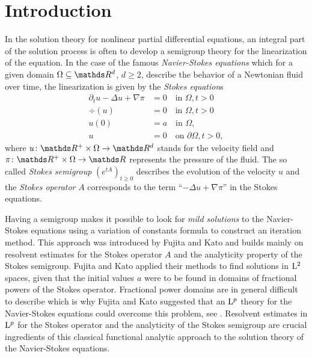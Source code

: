 \chapter*{Introduction}

In the solution theory for nonlinear partial differential equations, an integral part of the solution process is often to develop a semigroup theory for the linearization of the equation.
In the case of the famous \emph{Navier-Stokes equations} which for a given domain $\Omega \subseteq \R^d$, $d \geq 2$, describe the behavior of a Newtonian fluid over time, the linearization is given by the \emph{Stokes equation}s
\begin{align*}
  \partial_t u - \Delta u + \nabla \pi &= 0 \quad\text{in } \Omega, t > 0\\
  \div(u) &= 0 \quad\text{in } \Omega, t > 0 \\
  u(0) &= a \quad\text{in } \Omega, \\
  u &= 0 \quad\text{on } \partial\Omega, t > 0,
\end{align*}
where $u \colon \R^+ \times \Omega \to \R^d$ stands for the velocity field and $\pi \colon \R^+ \times \Omega \to \R$ represents the pressure of the fluid.
The so called \emph{Stokes semigroup} $(e^{tA})_{t \geq 0}$ describes the evolution of the velocity $u$ and the \emph{Stokes operator} $A$ corresponds to the term ``$-\Delta u + \nabla \pi$'' in the Stokes equations. 

Having a semigroup makes it possible to look for \emph{mild solutions} to the Navier-Stokes equations using a variation of constants formula to construct an iteration method.
This approach was introduced by Fujita and Kato \cite{fujitaKato,katoFujita} and builds mainly on resolvent estimates for the Stokes operator $A$ and the analyticity property of the Stokes semigroup.
Fujita and Kato applied their methods to find solutions in $\mathrm{L}^2$ spaces, given that the initial values $a$ were to be found in domains of fractional powers of the Stokes operator.
Fractional power domains are in general difficult to describe which is why Fujita and Kato suggested that an $\mathrm{L}^p$ theory for the Navier-Stokes equations could overcome this problem, see \cite[p.\@~313]{fujitaKato}.
Resolvent estimates in $\mathrm{L}^p$ for the Stokes operator and the analyticity of the Stokes semigroup are crucial ingredients of this classical functional analytic approach to the solution theory of the Navier-Stokes equations.

